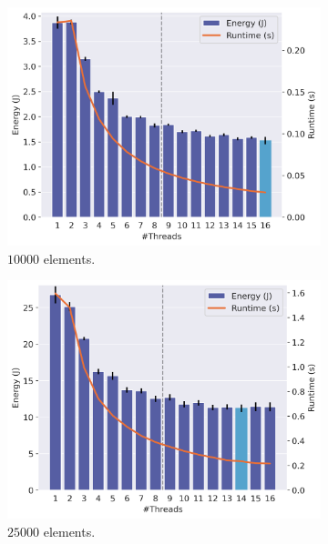 \begin{figure}[!ht]
    \centering
    \begin{subfigure}{0.33\linewidth}
        \includegraphics[width=\linewidth]{images/nbody_10000.png}
        \caption{$10000$ elements.}
        \label{fig:nbody1}
    \end{subfigure}%
    \begin{subfigure}{0.33\linewidth}
        \includegraphics[width=\linewidth]{images/nbody_25000.png}
        \caption{$25000$ elements.}
        \label{fig:nbody2}
    \end{subfigure}%
    \begin{subfigure}{0.33\linewidth}

\end{subfigure}
\end{figure}
